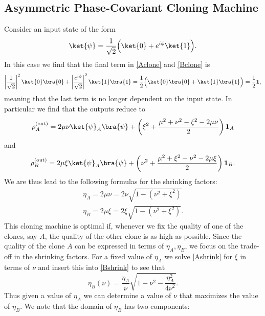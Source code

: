 \documentclass[reqno]{amsart}
\numberwithin{lemma}{section}
\numberwithin{proposition}{section}
\begin{document}
\subsection{Asymmetric Phase-Covariant Cloning Machine}
Consider an input state of the form
\begin{equation*}
    \ket{\psi} = \frac{1}{\sqrt{2}} \Big ( \ket{0} + e^{i\phi} \ket{1} \Big ).
\end{equation*}
In this case we find that the final term in \eqref{Aclone} and \eqref{Bclone} is 
\begin{align*}
    \left \vert \frac{1}{\sqrt{2}} \right \vert^{2} \ket{0} \bra{0} + \left \vert \frac{e^{i\phi}}{\sqrt{2}} \right \vert^{2} \ket{1} \bra{1} = \frac{1}{2} \Big ( \ket{0} \bra{0} + \ket{1} \bra{1} \Big ) = \frac{1}{2} \mathbf{1},
\end{align*}
meaning that the last term is no longer dependent on the input state. In particular we find that the outputs reduce to
\begin{equation}
\label{PCAclone}
    \rho_{A}^{\text{(out)}} = 2 \mu \nu \ket{\psi}_{A} \bra{\psi} + \left ( \xi^{2} + \frac{\mu^{2} + \nu^{2} - \xi^{2} - 2\mu \nu}{2} \right )  \mathbf{1}_{A} 
\end{equation}
and
\begin{equation}
\label{PCBclone}
    \rho_{B}^{\text{(out)}} = 2 \mu \xi \ket{\psi}_{A} \bra{\psi} + \left ( \nu^{2} + \frac{\mu^{2} + \xi^{2} - \nu^{2} - 2\mu \xi}{2} \right ) \mathbf{1}_{B}.
\end{equation}
We are thus lead to the following formulas for the shrinking factors:
\begin{align}
    \eta_{A} = 2 \mu \nu = 2\nu \sqrt{1 - (\nu^{2} + \xi^{2})} \label{Ashrink}\\
    \eta_{B} = 2 \mu \xi = 2 \xi \sqrt{1 - (\nu^{2} + \xi^{2})} \label{Bshrink}.
\end{align}
This cloning machine is optimal if, whenever we fix the quality of one of the clones, say $A$, the quality of the other clone is as high as possible. Since the quality of the clone $A$ can be expressed in terms of $\eta_{A}, \eta_{B}$, we focus on the trade-off in the shrinking factors. For a fixed value of $\eta_{A}$ we solve \eqref{Ashrink} for $\xi$ in terms of $\nu$ and insert this into \eqref{Bshrink} to see that
\begin{equation}
	\label{etaB_optimal}
    \eta_{B}(\nu) = \frac{\eta_{A}}{\nu} \sqrt{1 - \nu^{2} - \frac{\eta_{A}^{2}}{4 \nu^{2}}}.
\end{equation}
Thus given a value of $\eta_{A}$ we can determine a value of $\nu$ that maximizes the value of $\eta_{B}.$ We note that the domain of $\eta_{B}$ has two components:
\end{document}
